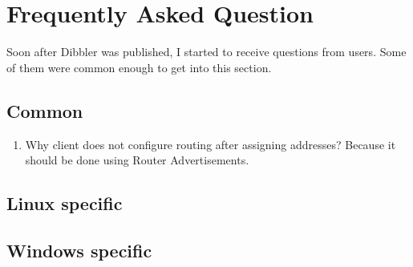 
\section{Frequently Asked Question}

Soon after Dibbler was published, I started to receive questions from
users. Some of them were common enough to get into this section.

\subsection{Common}

\begin{enumerate}
\item Why client does not configure routing after assigning addresses?
Because it should be done using Router Advertisements.

\end{enumerate}

\subsection{Linux specific}


\subsection{Windows specific}
